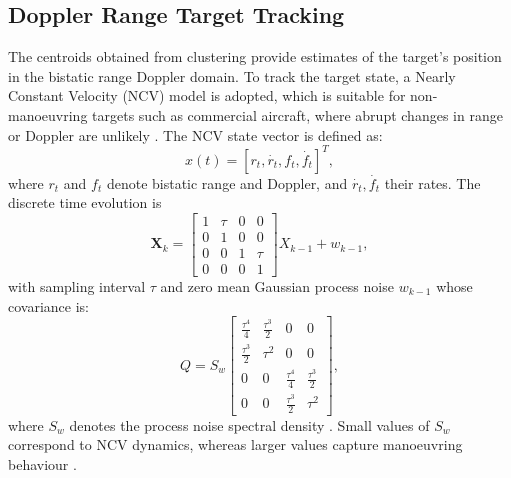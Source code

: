 \documentclass[conference,10pt,a4paper]{IEEEtran}%
\begin{document}
\subsection{Doppler Range Target Tracking}
The centroids obtained from clustering provide estimates of the target's position in the bistatic range Doppler domain. To track the target state, a Nearly Constant Velocity (NCV) model is adopted, which is suitable for non-manoeuvring targets such as commercial aircraft, where abrupt changes in range or Doppler are unlikely \cite{Li2003a}. The NCV state vector is defined as:                                                                   
\begin{equation}
  x(t) = [r_t, \dot{r_t}, f_t, \dot{f_t}]^T,                                    
\end{equation}                                                                                                                                           
where $r_t$ and $f_t$ denote bistatic range and Doppler, and $\dot{r_t}, \dot{f_t}$ their rates. The discrete time evolution is                          
\begin{equation}                                                               
  \mathbf{X}_k =
  \begin{bmatrix}                                                   
      1 & \tau & 0 & 0 \\
      0 & 1 & 0 & 0 \\                                              
      0 & 0 & 1 & \tau \\                                           
      0 & 0 & 0 & 1                                               
  \end{bmatrix} X_{k-1} + w_{k-1},                            
\end{equation}                                                
with sampling interval $\tau$ and zero mean Gaussian process noise $w_{k-1}$ whose covariance is:                                            
\begin{equation}                                               
  Q = S_w     
  \begin{bmatrix}                                              
      \tfrac{\tau^4}{4} & \tfrac{\tau^3}{2} & 0 & 0 \\
      \tfrac{\tau^3}{2} & \tau^2 & 0 & 0 \\                        
      0 & 0 & \tfrac{\tau^4}{4} & \tfrac{\tau^3}{2} \\             
      0 & 0 & \tfrac{\tau^3}{2} & \tau^2                          
  \end{bmatrix},                                               
\end{equation}                                                                                                                                           
where $S_w$ denotes the process noise spectral density \cite{Measurements2023b}. Small values of $S_w$ correspond to NCV dynamics, whereas larger values capture manoeuvring behaviour \cite{953264}.                                                                                                        
\end{document}
